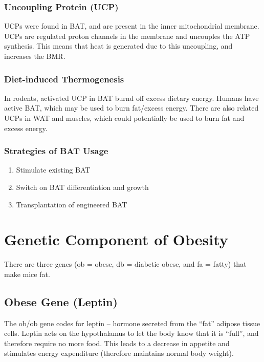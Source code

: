 \subsubsection{Uncoupling Protein (UCP)}

UCPs were found in BAT, and are present in the inner mitochondrial membrane.
UCPs are regulated proton channels in the membrane and uncouples the ATP synthesis.
This means that heat is generated due to this uncoupling, and increases the BMR.

\subsubsection{Diet-induced Thermogenesis}

In rodents, activated UCP in BAT burnd off excess dietary energy.
Humans have active BAT, which may be used to burn fat/excess energy.
There are also related UCPs in WAT and muscles, which could potentially be used to burn fat and excess energy.

\subsubsection{Strategies of BAT Usage}

\begin{enumerate}
\item Stimulate existing BAT
\item Switch on BAT differentiation and growth
\item Transplantation of engineered BAT
\end{enumerate}

\section{Genetic Component of Obesity}

There are three genes (ob = obese, db = diabetic obese, and fa = fatty) that make mice fat.

\subsection{Obese Gene (Leptin)}

The ob/ob gene codes for leptin -- hormone secreted from the ``fat'' adipose tissue cells.
Leptin acts on the hypothalamus to let the body know that it is ``full'', and therefore require no more food.
This leads to a decrease in appetite and stimulates energy expenditure (therefore maintains normal body weight).


